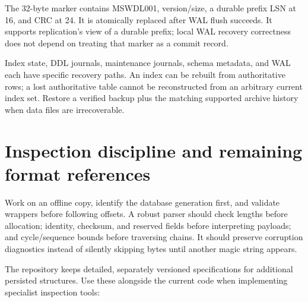 The 32-byte  marker contains MSWDL001, version/size, a durable prefix LSN at 16, and CRC at 24. It is atomically replaced after WAL flush succeeds. It supports replication's view of a durable prefix; local WAL recovery correctness does not depend on treating that marker as a commit record.

Index state, DDL journals, maintenance journals, schema metadata, and WAL each have specific recovery paths. An index can be rebuilt from authoritative rows; a lost authoritative table cannot be reconstructed from an arbitrary current index set. Restore a verified backup plus the matching supported archive history when data files are irrecoverable.


\section{Inspection discipline and remaining format references}

Work on an offline copy, identify the database generation first, and validate wrappers before following offsets. A robust parser should check lengths before allocation; identity, checksum, and reserved fields before interpreting payloads; and cycle/sequence bounds before traversing chains. It should preserve corruption diagnostics instead of silently skipping bytes until another magic string appears.

The repository keeps detailed, separately versioned specifications for additional persisted structures. Use these alongside the current code when implementing specialist inspection tools:

